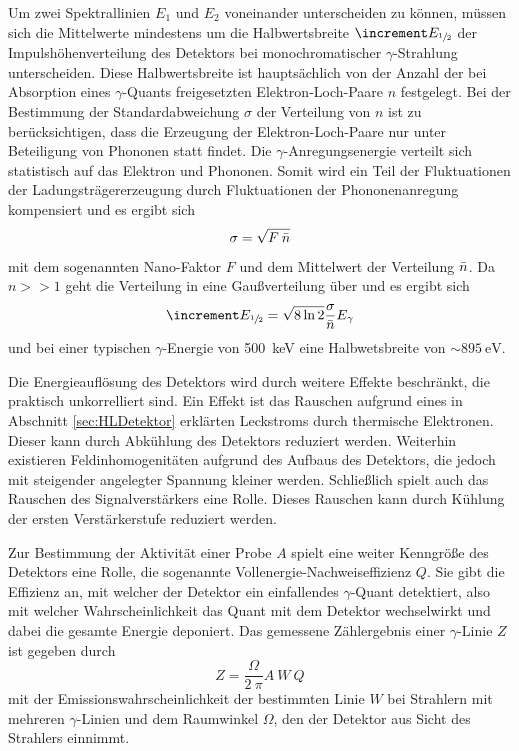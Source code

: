 Um zwei Spektrallinien $E_1$ und $E_2$ voneinander unterscheiden zu können, müssen
sich die Mittelwerte mindestens um die Halbwertsbreite $\increment E_{\sfrac{1}{2}}$
der Impulshöhenverteilung des Detektors bei monochromatischer $\gamma$-Strahlung unterscheiden.
Diese Halbwertsbreite ist hauptsächlich von der Anzahl der bei Absorption eines $\gamma$-Quants
freigesetzten Elektron-Loch-Paare $n$ festgelegt.
Bei der Bestimmung der Standardabweichung $\sigma$ der Verteilung von $n$ ist zu berücksichtigen, dass die
Erzeugung der Elektron-Loch-Paare nur unter Beteiligung von Phononen statt findet.
Die $\gamma$-Anregungsenergie verteilt sich statistisch auf das Elektron und Phononen.
Somit wird ein Teil der Fluktuationen der Ladungsträgererzeugung durch Fluktuationen der
Phononenanregung kompensiert und es ergibt sich
\begin{equation}
	\sigma = \sqrt{F\:\bar{n}}
\end{equation}
mit dem sogenannten Nano-Faktor $F$ und dem Mittelwert der Verteilung $\bar{n}$.
Da $n >> 1$ geht die Verteilung in eine Gaußverteilung über und es ergibt sich
\begin{equation}
	\increment E_{\sfrac{1}{2}} = \sqrt{8 \ln2} \frac{\sigma}{\mean{n}} E_\gamma
\end{equation}
und bei einer typischen $\gamma$-Energie von \SI{500}{\kilo\electronvolt} eine
Halbwetsbreite von $\sim \SI{895}{\electronvolt}$.

Die Energieauflösung des Detektors wird durch weitere Effekte beschränkt, die praktisch unkorrelliert sind.
Ein Effekt ist das Rauschen aufgrund eines in Abschnitt \ref{sec:HLDetektor} erklärten Leckstroms
durch thermische Elektronen. Dieser kann durch Abkühlung des Detektors reduziert werden.
Weiterhin existieren Feldinhomogenitäten aufgrund des Aufbaus des Detektors, die jedoch
mit steigender angelegter Spannung kleiner werden.
Schließlich spielt auch das Rauschen des Signalverstärkers eine Rolle. Dieses Rauschen
kann durch Kühlung der ersten Verstärkerstufe reduziert werden.

Zur Bestimmung der Aktivität einer Probe $A$ spielt eine weiter Kenngröße des Detektors eine
Rolle, die sogenannte Vollenergie-Nachweiseffizienz $Q$.
Sie gibt die Effizienz an, mit welcher der Detektor ein einfallendes $\gamma$-Quant
detektiert, also mit welcher Wahrscheinlichkeit das Quant mit dem Detektor
wechselwirkt und dabei die gesamte Energie deponiert.
Das gemessene Zählergebnis einer $\gamma$-Linie $Z$ ist gegeben durch
\begin{equation}
	Z = \frac{\Omega}{2\:\pi} A\:W\:Q
	\label{eqn:Vollenergie-Nachweiseffizienz}
\end{equation}
mit der Emissionswahrscheinlichkeit der bestimmten Linie $W$ bei Strahlern mit mehreren
$\gamma$-Linien und dem Raumwinkel $\Omega$, den der Detektor aus Sicht des Strahlers einnimmt.

